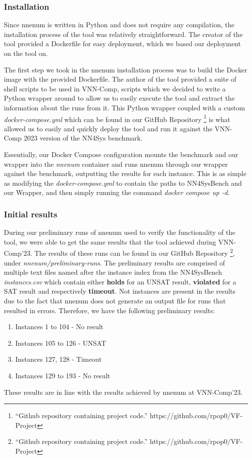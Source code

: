 \documentclass[12pt]{report}
\begin{document}
\subsubsection{Installation}
Since nnenum is written in Python and does not require any compilation, the installation process of the tool was relatively straightforward.
The creator of the tool provided a Dockerfile for easy deployment, which we based our deployment on the tool on.

The first step we took in the nnenum installation process was to build the Docker image with the provided Dockerfile.
The author of the tool provided a suite of shell scripts to be used in VNN-Comp, scripts which we decided to write a Python wrapper around to allow us to easily execute the tool and extract the information about the runs from it.
This Python wrapper coupled with a custom \textit{docker-compose.yml} which can be found in our GitHub Repository \footnote{“Github repository containing project code.”  https://github.com/rpop0/VF-Project} is what allowed us to easily and quickly deploy the tool and run it against the VNN-Comp 2023 version of the NN4Sys benchmark.

Essentially, our Docker Compose configuration mounts the benchmark and our wrapper into the \textit{nnenum} container and runs nnenum through our wrapper against the benchmark, outputting the results for each instance. This is as simple as modifying the \textit{docker-compose.yml} to contain the paths to NN4SysBench and our Wrapper, and then simply running the command \textit{docker compose up -d}.

\subsubsection{Initial results}
During our preliminary runs of nnenum used to verify the functionality of the tool, we were able to get the same results that the tool achieved during VNN-Comp'23.
The results of these runs can be found in our GitHub Repository \footnote{“Github repository containing project code.” https://github.com/rpop0/VF-Project}, under \textit{nnenum/preliminary-runs}.
The preliminary results are comprised of multiple text files named after the instance index from the NN4SysBench \textit{instances.csv} which contain either \textbf{holds} for an UNSAT result, \textbf{violated} for a SAT result and respectively \textbf{timeout}.
Not instances are present in the results due to the fact that nnenum does not generate an output file for runs that resulted in errors.
Therefore, we have the following preliminary results:
\begin{enumerate}
    \item Instances 1 to 104 - No result
    \item Instances 105 to 126 - UNSAT
    \item Instances 127, 128 - Timeout
    \item Instances 129 to 193 - No result
\end{enumerate}
These results are in line with the results achieved by nnenum at VNN-Comp'23.
\end{document}

